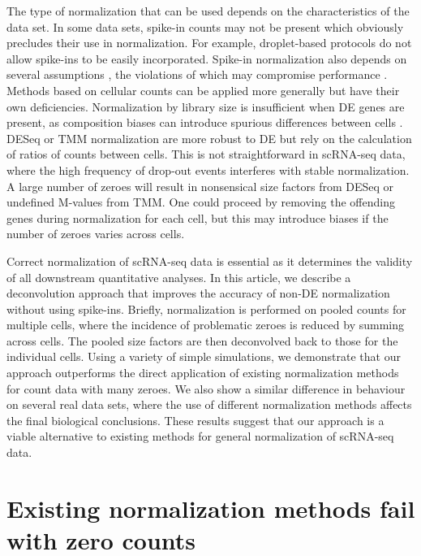 \documentclass{article}
\begin{document}
The type of normalization that can be used depends on the characteristics of the data set.
In some data sets, spike-in counts may not be present which obviously precludes their use in normalization.
For example, droplet-based protocols \cite{klein2015droplet,macosko2015highly} do not allow spike-ins to be easily incorporated.
Spike-in normalization also depends on several assumptions \cite{robinson2010scaling,marinov2014singlecell,grun2015design}, 
    the violations of which may compromise performance \cite{risso2014normalization}.
Methods based on cellular counts can be applied more generally but have their own deficiencies.
Normalization by library size is insufficient when DE genes are present, as composition biases can introduce spurious differences between cells \cite{robinson2010scaling}.
DESeq or TMM normalization are more robust to DE but rely on the calculation of ratios of counts between cells.
This is not straightforward in scRNA-seq data, where the high frequency of drop-out events interferes with stable normalization.
A large number of zeroes will result in nonsensical size factors from DESeq or undefined M-values from TMM.
One could proceed by removing the offending genes during normalization for each cell, but this may introduce biases if the number of zeroes varies across cells.

Correct normalization of scRNA-seq data is essential as it determines the validity of all downstream quantitative analyses.
In this article, we describe a deconvolution approach that improves the accuracy of non-DE normalization without using spike-ins.
Briefly, normalization is performed on pooled counts for multiple cells, where the incidence of problematic zeroes is reduced by summing across cells.
The pooled size factors are then deconvolved back to those for the individual cells.
Using a variety of simple simulations, we demonstrate that our approach outperforms the direct application of existing normalization methods for count data with many zeroes.
We also show a similar difference in behaviour on several real data sets, where the use of different normalization methods affects the final biological conclusions.
These results suggest that our approach is a viable alternative to existing methods for general normalization of scRNA-seq data.

\section{Existing normalization methods fail with zero counts}
\end{document}
